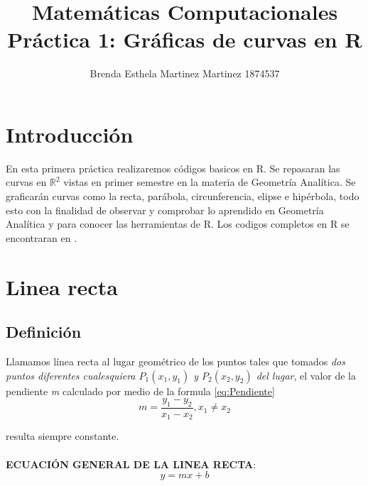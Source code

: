 \documentclass[12pt,a4paper]{article}
\title{Matemáticas Computacionales \\ Práctica 1: Gráficas de curvas en R}
\author{Brenda Esthela Martinez Martinez  1874537}
\begin{document}
\maketitle 

\section{Introducci\'{o}n}\label{sec:intro}

En esta primera práctica realizaremos códigos basicos en R. Se repasaran las curvas en $\mathbb{R}^2$ vistas en primer semestre en la materia de Geometría Analítica. Se graficarán curvas como la recta, parábola, circunferencia, elipse e hipérbola, todo esto con la finalidad de observar y comprobar lo aprendido en Geometría Analítica y para conocer las herramientas de R. Los codigos completos en R se encontraran en \cite{repositorio}.

\section{Linea recta} \label{sec:Linea recta}
\subsection{Definici\'{o}n} \label{subsec:DefLR}
Llamamos línea recta al lugar geométrico de los puntos tales que tomados \emph{dos puntos diferentes cualesquiera $ P_1 (x_1 , y_1) $ y $ P_2 (x_2 , y_2) $ del lugar}, el valor de la pendiente \emph{m} calculado por medio de la formula \ref{eq:Pendiente} 
\begin{equation}
m = \frac{y_1 - y_2}{x_1 - x_2}, x_1 \neq x_2 \label{eq:Pendiente} 
\end{equation}

resulta siempre constante. \cite{geometria}\\ \\

\textbf{ECUACIÓN GENERAL DE LA LINEA RECTA}:
\begin{equation}
y = mx + b \label{eq:pendienteinterseccion}
\end{equation}
\end{document}
